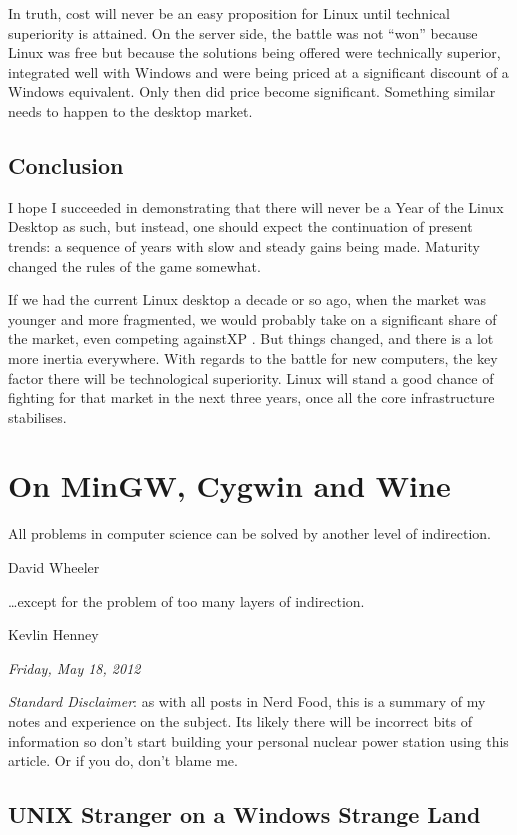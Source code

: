 \documentclass{book}
\begin{document}
In truth, cost will never be an easy proposition for Linux until
technical superiority is attained. On the server side, the battle was
not ``won'' because Linux was free but because the solutions being
offered were technically superior, integrated well with Windows and
were being priced at a significant discount of a Windows
equivalent. Only then did price become significant. Something similar
needs to happen to the desktop market.

\section{Conclusion}

I hope I succeeded in demonstrating that there will never be a Year of
the Linux Desktop as such, but instead, one should expect the
continuation of present trends: a sequence of years with slow and
steady gains being made. Maturity changed the rules of the game
somewhat.

If we had the current Linux desktop a decade or so ago, when the
market was younger and more fragmented, we would probably take on a
significant share of the market, even competing againstXP . But things
changed, and there is a lot more inertia everywhere. With regards to
the battle for new computers, the key factor there will be
technological superiority. Linux will stand a good chance of fighting
for that market in the next three years, once all the core
infrastructure stabilises.

\chapter{On MinGW, Cygwin and Wine}

\epigraph{All problems in computer science can be solved by another
  level of indirection.} {David Wheeler}

\epigraph{\ldots except for the problem of too many layers of
  indirection.} {Kevlin Henney}

\begin{flushright}
  \emph{Friday, May 18, 2012}
\end{flushright}

\emph{Standard Disclaimer}: as with all posts in Nerd Food, this is a
summary of my notes and experience on the subject. Its likely there
will be incorrect bits of information so don't start building your
personal nuclear power station using this article. Or if you do, don't
blame me.

\section{UNIX Stranger on a Windows Strange Land}
\end{document}
